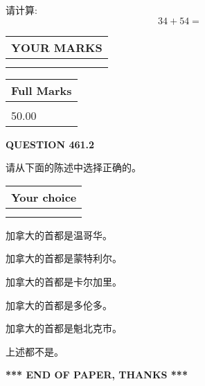 \documentclass{ctexart}
\begin{document}
  
 
请计算:
\begin{equation}
34 +  %
54 = \nonumber
\end{equation}
 

 

 
  
\vspace{0.2in}
  
\noindent\begin{tabular}{|l|}
\hline
 YOUR MARKS  \\
\hline
 \\ 
 \\ 
\hline
\end{tabular}
\hspace{0.05in} \begin{tabular}{|l|}
\hline
 Full Marks  \\
\hline
 \\ 
50.00 \\
\hline
\end{tabular}
{\textbf{\Large{QUESTION
461.2 
}}}
  
  
请从下面的陈述中选择正确的。
  
  
\noindent\hspace{3.0in} \begin{tabular}{|l|}
\hline
Your choice \\
\hline
 \\ 
 \\ 
\hline
\end{tabular}
  
  
 
 
加拿大的首都是温哥华。
 
 
加拿大的首都是蒙特利尔。
 
 
加拿大的首都是卡尔加里。
 
 
加拿大的首都是多伦多。
 
 
加拿大的首都是魁北克市。
 
 
 上述都不是。
 
 
   
   
 \vspace{0.2in}
 
   
   
   
   
\vspace{1.0in} 
{\textbf{\large{ *** END OF PAPER, THANKS *** }}} 
   
\end{document}
